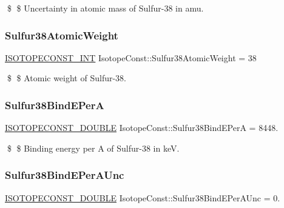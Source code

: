 \$ \$ Uncertainty in atomic mass of Sulfur-\/38 in amu. \mbox{\label{group___isotope_const-_sulfur-_s38_ga3e41ac82b47adba85cd22fdbf1f029d5}} 
\subsubsection{\texorpdfstring{Sulfur38\+Atomic\+Weight}{Sulfur38AtomicWeight}}
{\footnotesize\ttfamily \mbox{\hyperlink{group___isotope_const-_macros_ga5f18360b3e99483a35c32d789e62621c}{I\+S\+O\+T\+O\+P\+E\+C\+O\+N\+S\+T\+\_\+\+I\+NT}} Isotope\+Const\+::\+Sulfur38\+Atomic\+Weight = 38}

\$ \$ Atomic weight of Sulfur-\/38. \mbox{\label{group___isotope_const-_sulfur-_s38_gaad874efea7e83d33f5993488dbb85d47}} 
\subsubsection{\texorpdfstring{Sulfur38\+Bind\+E\+PerA}{Sulfur38BindEPerA}}
{\footnotesize\ttfamily \mbox{\hyperlink{group___isotope_const-_macros_ga8f45a7272ce02c0b4c65c44636ed719a}{I\+S\+O\+T\+O\+P\+E\+C\+O\+N\+S\+T\+\_\+\+D\+O\+U\+B\+LE}} Isotope\+Const\+::\+Sulfur38\+Bind\+E\+PerA = 8448.}

\$ \$ Binding energy per A of Sulfur-\/38 in keV. \mbox{\label{group___isotope_const-_sulfur-_s38_gab4502d922f7dd9b178052e03d669e455}} 
\subsubsection{\texorpdfstring{Sulfur38\+Bind\+E\+Per\+A\+Unc}{Sulfur38BindEPerAUnc}}
{\footnotesize\ttfamily \mbox{\hyperlink{group___isotope_const-_macros_ga8f45a7272ce02c0b4c65c44636ed719a}{I\+S\+O\+T\+O\+P\+E\+C\+O\+N\+S\+T\+\_\+\+D\+O\+U\+B\+LE}} Isotope\+Const\+::\+Sulfur38\+Bind\+E\+Per\+A\+Unc = 0.}


